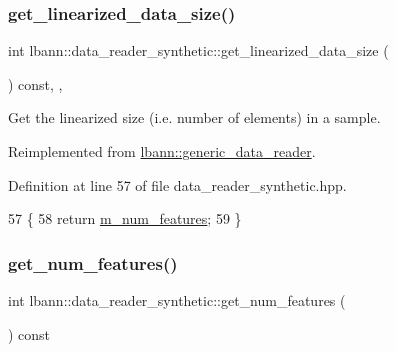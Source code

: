 \subsubsection{\texorpdfstring{get\+\_\+linearized\+\_\+data\+\_\+size()}{get\_linearized\_data\_size()}}
{\footnotesize\ttfamily int lbann\+::data\+\_\+reader\+\_\+synthetic\+::get\+\_\+linearized\+\_\+data\+\_\+size (\begin{DoxyParamCaption}{ }\end{DoxyParamCaption}) const\hspace{0.3cm}{\ttfamily [inline]}, {\ttfamily [override]}, {\ttfamily [virtual]}}



Get the linearized size (i.\+e. number of elements) in a sample. 



Reimplemented from \hyperlink{classlbann_1_1generic__data__reader_a246a719477c8c7b6122d41b6f5618d41}{lbann\+::generic\+\_\+data\+\_\+reader}.



Definition at line 57 of file data\+\_\+reader\+\_\+synthetic.\+hpp.


\begin{DoxyCode}
57                                                 \{
58     \textcolor{keywordflow}{return} \hyperlink{classlbann_1_1data__reader__synthetic_a18f0ba6014a0f1edec24c7c3c109c520}{m\_num\_features};
59   \}
\end{DoxyCode}
\mbox{\label{classlbann_1_1data__reader__synthetic_aced84d4619326d4100871bcc7773c41a}} 
\subsubsection{\texorpdfstring{get\+\_\+num\+\_\+features()}{get\_num\_features()}}
{\footnotesize\ttfamily int lbann\+::data\+\_\+reader\+\_\+synthetic\+::get\+\_\+num\+\_\+features (\begin{DoxyParamCaption}{ }\end{DoxyParamCaption}) const\hspace{0.3cm}{\ttfamily [inline]}}




